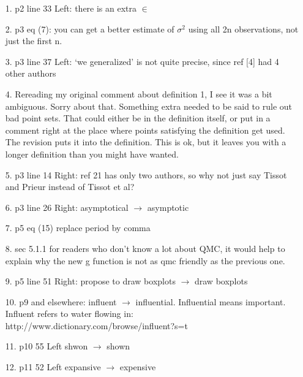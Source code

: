 \documentclass[10pt,a4paper]{article}
\begin{document}
\begin{itemize}
\item[1.] p2 line 33 Left: there is an extra $\in$

\item[2.] p3 eq (7): you can get a better estimate of $\sigma^2$ using all 2n observations, not just the first n.

\item[3.] p3 line 37 Left: `we generalized' is not quite precise, since ref [4] had 4 other authors

\item[4.] Rereading my original comment about definition 1, I see it was a bit ambiguous. Sorry about that. Something extra needed to be said to rule out bad point sets.  That could either be in the definition itself, or put in a comment right at the place where points satisfying the definition get used.  The revision puts it into the definition.  This is ok, but it leaves you with a longer definition than you might have wanted.

\item[5.] p3 line 14 Right: ref 21 has only two authors, so why not just say Tissot and Prieur instead of Tissot et al?

\item[6.] p3 line 26 Right: asymptotical $\rightarrow$ asymptotic

\item[7.] p5 eq (15) replace period by comma

\item[8.] sec 5.1.1  for readers who don't know a lot about QMC, it would help to explain why the new g function is not as qmc friendly as the previous one.

\item[9.] p5 line 51 Right: propose to draw boxplots $\rightarrow$ draw boxplots

\item[10.] p9 and elsewhere: influent $\rightarrow$ influential.  Influential means important. Influent refers to water flowing in: \\
http://www.dictionary.com/browse/influent?s=t

\item[11.] p10 55 Left shwon $\rightarrow$ shown

\item[12.] p11 52 Left expansive $\rightarrow$ expensive
\end{itemize}
\end{document}
